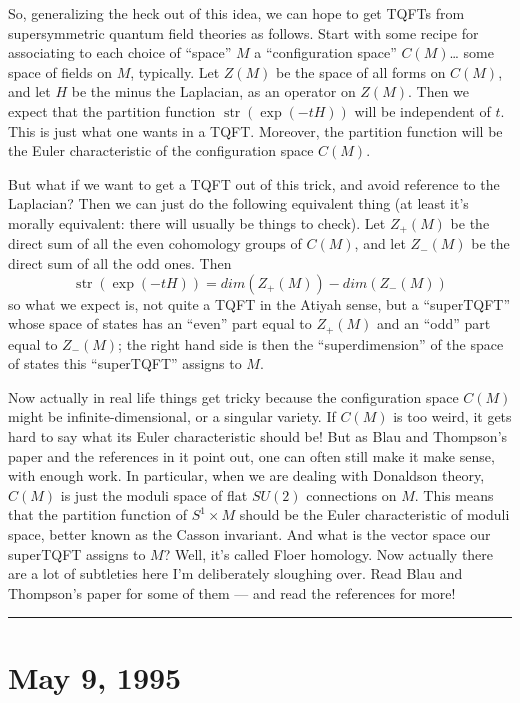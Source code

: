 \documentclass{article}
\begin{document}
So, generalizing the heck out of this idea, we can hope to get TQFTs
from supersymmetric quantum field theories as follows. Start with some
recipe for associating to each choice of ``space'' \(M\) a
``configuration space'' \(C(M)\)\ldots{} some space of fields on \(M\),
typically. Let \(Z(M)\) be the space of all forms on \(C(M)\), and let
\(H\) be the minus the Laplacian, as an operator on \(Z(M)\). Then we
expect that the partition function \(\operatorname{str}(\exp(-tH))\)
will be independent of \(t\). This is just what one wants in a TQFT.
Moreover, the partition function will be the Euler characteristic of the
configuration space \(C(M)\).

But what if we want to get a TQFT out of this trick, and avoid reference
to the Laplacian? Then we can just do the following equivalent thing (at
least it's morally equivalent: there will usually be things to check).
Let \(Z_+(M)\) be the direct sum of all the even cohomology groups of
\(C(M)\), and let \(Z_-(M)\) be the direct sum of all the odd ones. Then
\[\operatorname{str}(\exp(-tH)) = dim(Z_+(M))-dim(Z_-(M))\] so what we
expect is, not quite a TQFT in the Atiyah sense, but a ``superTQFT''
whose space of states has an ``even'' part equal to \(Z_+(M)\) and an
``odd'' part equal to \(Z_-(M)\); the right hand side is then the
``superdimension'' of the space of states this ``superTQFT'' assigns to
\(M\).

Now actually in real life things get tricky because the configuration
space \(C(M)\) might be infinite-dimensional, or a singular variety. If
\(C(M)\) is too weird, it gets hard to say what its Euler characteristic
should be! But as Blau and Thompson's paper and the references in it
point out, one can often still make it make sense, with enough work. In
particular, when we are dealing with Donaldson theory, \(C(M)\) is just
the moduli space of flat \(SU(2)\) connections on \(M\). This means that
the partition function of \(S^1\times M\) should be the Euler
characteristic of moduli space, better known as the Casson invariant.
And what is the vector space our superTQFT assigns to \(M\)? Well, it's
called Floer homology. Now actually there are a lot of subtleties here
I'm deliberately sloughing over. Read Blau and Thompson's paper for some
of them --- and read the references for more!

\begin{center}\rule{0.5\linewidth}{0.5pt}\end{center}
\hypertarget{week52}{%
\section{May 9, 1995}\label{week52}}
\end{document}
